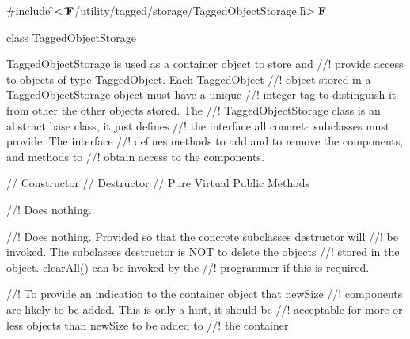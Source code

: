 
\indent \#include \f$<\tilde{ }{\bf F}$/utility/tagged/storage/TaggedObjectStorage.h\f$>{\bf F}$

\indent class TaggedObjectStorage


\indent TaggedObjectStorage is used as a container object to store and
//! provide access to objects of type TaggedObject. Each TaggedObject
//! object stored in a TaggedObjectStorage object must have a unique
//! integer tag to distinguish it from other the other objects stored. The
//! TaggedObjectStorage class is an abstract base class, it just defines
//! the interface all concrete subclasses must provide. The interface
//! defines methods to add and to remove the components, and methods to
//! obtain access to the components.

\indent // Constructor
\indent // Destructor
\indent // Pure Virtual Public Methods

//! Does nothing.

//! Does nothing. Provided so that the concrete subclasses destructor will
//! be invoked. The subclasses destructor is NOT to delete the objects
//! stored in the object. clearAll() can be invoked by the
//! programmer if this is required.

//! To provide an indication to the container object that \p newSize
//! components are likely to be added. This is only a hint, it should be
//! acceptable for more or less objects than \p newSize to be added to
//! the container.

